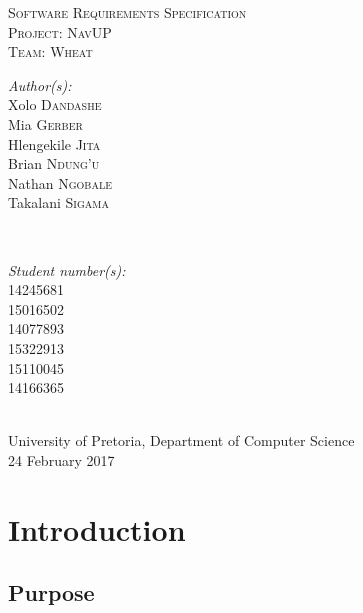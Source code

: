 \documentclass[a4paper,12pt]{article}
\begin{document}
\begin{titlepage}
\center

\textsc{\LARGE Software Requirements Specification}\\[1.5cm]
\textsc{\Large Project: NavUP}\\[1.5cm]
\textsc{\large Team: Wheat}\\[0.5cm]

\begin{minipage}{0.4\textwidth}
\begin{flushleft} \large
\emph{Author(s):}\\
Xolo \textsc{Dandashe}\\
Mia \textsc{Gerber}\\
Hlengekile \textsc{Jita}\\
Brian \textsc{Ndung'u}\\
Nathan \textsc{Ngobale}\\
Takalani \textsc{Sigama}\\
\end{flushleft}
\end{minipage}
~
\begin{minipage}{0.4\textwidth}
\begin{flushright} \large
\emph{Student number(s):} \\
14245681\\ %
15016502\\
14077893\\
15322913\\
15110045\\
14166365\\
\end{flushright}
\end{minipage}\\


{\large University of Pretoria, Department of Computer Science}\\

{\large 24 February 2017}\\[3cm]

\vfil

\end{titlepage}

\newpage
\tableofcontents
\newpage
\section{Introduction}
\subsection{Purpose}
\end{document}
